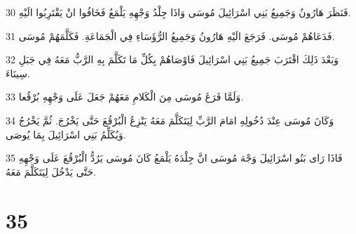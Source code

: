 \par 30 فَنَظَرَ هَارُونُ وَجَمِيعُ بَنِي اسْرَائِيلَ مُوسَى وَاذَا جِلْدُ وَجْهِهِ يَلْمَعُ فَخَافُوا انْ يَقْتَرِبُوا الَيْهِ.
\par 31 فَدَعَاهُمْ مُوسَى. فَرَجَعَ الَيْهِ هَارُونُ وَجَمِيعُ الرُّؤَسَاءِ فِي الْجَمَاعَةِ. فَكَلَّمَهُمْ مُوسَى.
\par 32 وَبَعْدَ ذَلِكَ اقْتَرَبَ جَمِيعُ بَنِي اسْرَائِيلَ فَاوْصَاهُمْ بِكُلِّ مَا تَكَلَّمَ بِهِ الرَّبُّ مَعَهُ فِي جَبَلِ سِينَاءَ.
\par 33 وَلَمَّا فَرَغَ مُوسَى مِنَ الْكَلامِ مَعَهُمْ جَعَلَ عَلَى وَجْهِهِ بُرْقُعا.
\par 34 وَكَانَ مُوسَى عِنْدَ دُخُولِهِ امَامَ الرَّبِّ لِيَتَكَلَّمَ مَعَهُ يَنْزِعُ الْبُرْقُعَ حَتَّى يَخْرُجَ. ثُمَّ يَخْرُجُ وَيُكَلِّمُ بَنِي اسْرَائِيلَ بِمَا يُوصَى.
\par 35 فَاذَا رَاى بَنُو اسْرَائِيلَ وَجْهَ مُوسَى انَّ جِلْدَهُ يَلْمَعُ كَانَ مُوسَى يَرُدُّ الْبُرْقُعَ عَلَى وَجْهِهِ حَتَّى يَدْخُلَ لِيَتَكَلَّمَ مَعَهُ.

\chapter{35}


